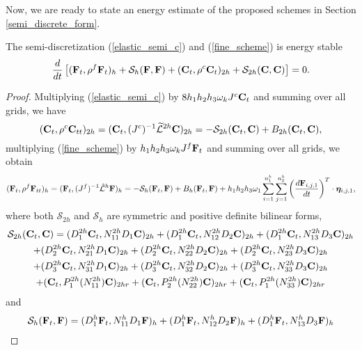 Now, we are ready to state an energy estimate of the proposed schemes in Section \ref{semi_discrete_form}. 
 \begin{theorem}\label{thm1}
  The semi-discretization (\ref{elastic_semi_c}) and (\ref{fine_scheme}) is energy stable 
  \[
  \frac{d}{dt}\left[({\bf F}_t,\rho^f {\bf F}_t)_{h} + \mathcal{S}_{h}({\bf F},{\bf F}) + ({\bf C}_t,\rho^{c} {\bf C}_t)_{2h} + \mathcal{S}_{2h}({\bf C},{\bf C}) \right]   = 0.
  \]
 \end{theorem}
 \begin{proof}
 Multiplying (\ref{elastic_semi_c}) by $8h_1h_2h_3\omega_kJ^{c}{\bf C}_t$ and summing over all grids, we have
\begin{equation*}\label{coarse_simple}
({\bf C}_t, {\rho}^{c}{\bf C}_{tt})_{2h} = ({\bf C}_t,({J^c})^{-1}\wt{\mathcal{L}}^{2h}{\bf C})_{2h} = -\mathcal{S}_{2h}({\bf C}_t,{\bf C}) + B_{2h}({\bf C}_t,{{\bf C}}),
\end{equation*}
multiplying (\ref{fine_scheme}) by $h_1h_2h_3\omega_kJ^f{\bf F}_t$ and summing over all grids, we obtain
\begin{equation*}
({\bf F}_t, {\rho}^f{\bf F}_{tt})_h = ({\bf F}_t,({J^f})^{-1}\hat{\mathcal{L}}^h{\bf F})_h = -\mathcal{S}_{h}({\bf F}_t,{\bf F}) + B_h({\bf F}_t,{\bf F}) 
+h_1h_2h_3\omega_1\sum_{i = 1}^{n_1^h}\sum_{j=1}^{n_2^h} \left(\frac{d{\bf F}_{i,j,1}}{dt}\right)^T\cdot{\bm \eta}_{i,j,1},
\end{equation*}
where  both $\mathcal{S}_{2h}$ and $\mathcal{S}_{h}$ are symmetric and positive definite bilinear forms, 
\begin{multline*}
\mathcal{S}_{2h}({\bf C}_t,{\bf C}) = ({D}_1^{2h}{\bf C}_t,{N}_{11}^{2h}{D}_1{\bf C})_{2h} +  ({D}_1^{2h}{\bf C}_t,{N}_{12}^{2h}{D}_2{\bf C})_{2h} +  ({D}_1^{2h}{\bf C}_t,{N}_{13}^{2h}{D}_3{\bf C})_{2h}\\
 +  ({D}_2^{2h}{\bf C}_t,{N}_{21}^{2h}{D}_1{\bf C})_{2h} 
+  ({D}_2^{2h}{\bf C}_t,{N}_{22}^{2h}{D}_2{\bf C})_{2h} +  ({D}_2^{2h}{\bf C}_t,{N}_{23}^{2h}{D}_3{\bf C})_{2h} \\
+  ({D}_3^{2h}{\bf C}_t,{N}_{31}^{2h}{D}_1{\bf C})_{2h} 
+  ({D}_3^{2h}{\bf C}_t,{N}_{32}^{2h}{D}_2{\bf C})_{2h} +  ({D}_3^{2h}{\bf C}_t,{N}_{33}^{2h}{D}_3{\bf C})_{2h}\\
+ ({\bf C}_t, P^{2h}_1(N_{11}^{2h}){\bf C})_{2hr} + ({\bf C}_t, P^{2h}_2(N_{22}^{2h}){\bf C})_{2hr} + ({\bf C}_t, P^{2h}_1(N_{33}^{2h}){\bf C})_{2hr}
\end{multline*}
and 
\begin{multline*}
\mathcal{S}_{h}({\bf F}_t,{\bf F}) = ({D}_1^{h}{\bf F}_t,{N}_{11}^{h}{D}_1{\bf F})_{h} +  ({D}_1^{h}{\bf F}_t,{N}_{12}^{h}{D}_2{\bf F})_{h} +  ({D}_1^{h}{\bf F}_t,{N}_{13}^{h}{D}_3{\bf F})_{h}\\

\end{multline*}
\end{proof}
